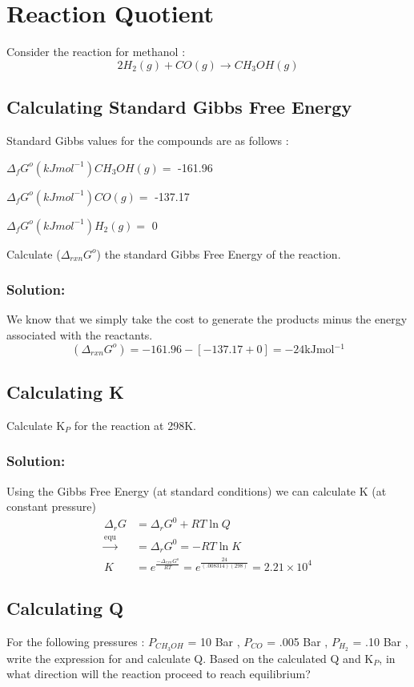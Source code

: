 \documentclass{article}
\newcommand{\be}{\begin{equation}}
\newcommand{\ee}{\end{equation}}
\begin{document}
\newpage

\section{Reaction Quotient}
Consider the reaction for methanol : 
\be
2H_2(g) + CO(g) \rightarrow CH_3OH(g) 
\ee

\subsection{Calculating Standard Gibbs Free Energy}
Standard Gibbs values for the compounds are as follows : 

\bigskip
$\Delta_fG^o (kJmol^{-1}) CH_3OH(g) = $ -161.96

\bigskip

$\Delta_fG^o (kJmol^{-1}) CO(g) =$ -137.17

\bigskip

$\Delta_fG^o (kJmol^{-1}) H_2(g) =$ 0

\bigskip
Calculate ($\Delta_{rxn}G^o$) the standard Gibbs Free Energy of the reaction. 

\subsubsection*{Solution:}
We know that we simply take the cost to generate the products minus the energy associated with the reactants. 
\be
(\Delta_{rxn}G^o) = -161.96 - [-137.17+0] = -24\text{kJmol$^{-1}$}
\ee

\subsection{Calculating K}
Calculate K$_P$ for the reaction at 298K. 

\subsubsection*{Solution:}
Using the Gibbs Free Energy (at standard conditions) we can calculate K (at constant pressure)
\be
\begin{split}
\Delta_rG &= \Delta_rG^0 + RT \ln Q \\
\xrightarrow{\text{equ}} &= \Delta_rG^0 = -RT \ln K\\
K &= e^{\frac{-\Delta_{rxn}G^o}{RT}} = e^{\frac{24}{(.008314)(298)}} = 2.21 \times 10^{4} 
\end{split}
\ee

\subsection{Calculating Q}
For the following pressures : $P_{CH_3OH}$ = 10 Bar , $P_{CO}$ = .005 Bar , $P_{H_2}$ = .10 Bar , write the expression for and calculate Q. 
Based on the calculated Q and K$_P$, in what direction will the reaction proceed to reach equilibrium? 
\end{document}
